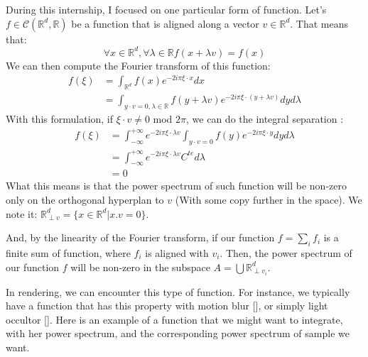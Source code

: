 \documentclass{classeENS}
\begin{document}
\> During this internship, I focused on one particular form of function.
    Let's $f\in\mathcal C(\mathbb R^d,\mathbb R)$ be a function that 
    is aligned along a vector $v \in \mathbb R^d$. That means that:
    \[ \forall x\in\mathbb R^d, \forall \lambda\in\mathbb R f(x+\lambda v) = f(x) \]
    We can then compute the Fourier transform of this function:
    \begin{align*}
        f(\xi) &= \int_{\mathbb R^d} f(x) e^{-2i\pi \xi\cdot x} dx \\
               &= \int_{y\cdot v=0, \lambda \in \mathbb R } f(y+\lambda v) 
                                    e^{-2i\pi \xi\cdot (y+\lambda v)} dy d\lambda
    \end{align*}
    With this formulation, if $\xi \cdot v \neq 0$ mod $2\pi$, we can do the integral separation : \begin{align*}
        f(\xi) &= \int_{-\infty}^{+\infty} e^{-2i\pi 
            \xi\cdot\lambda v} \int_{y\cdot v=0} f(y) e^{-2i\pi \xi\cdot y}  dy d\lambda \\
            &= \int_{-\infty}^{+\infty} e^{-2i\pi 
            \xi\cdot\lambda v} C^{te} d\lambda \\
            &= 0
    \end{align*}
    What this means is that the power spectrum of such function will be non-zero only on
    the orthogonal hyperplan to $v$ (With some copy further in the space). We note it: 
    $\mathbb R^d_{\perp v} = \{x \in \mathbb R^d | x.v = 0\}$.

\> And, by the linearity of the Fourier transform, if our function $f = \sum_i f_i$ is a finite sum 
    of function, where $f_i$ is aligned with $v_i$. Then, the power spectrum 
    of our function $f$ will be non-zero in the subspace 
    $A = \bigcup \mathbb R^d_{\perp v_i}$.

\> In rendering, we can encounter this type of function. For instance, 
    we typically have a function that has this property with motion blur [\cite{singh17convergence}], 
    or simply light occultor [\cite{journals/tog/EganHDR11}].
    Here is an example of a function that we might want to integrate, with her power
    spectrum, and the corresponding power spectrum of sample we want.
\end{document}
